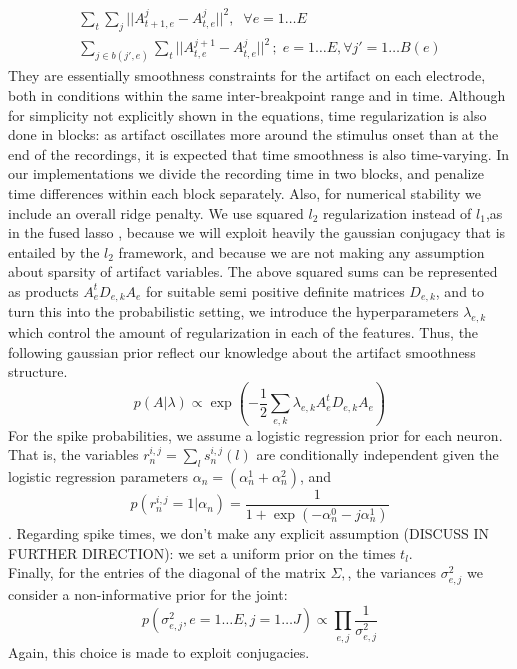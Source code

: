 \documentclass[12pt,letterpaper,fleqn]{article}
\begin{document}
\begin{eqnarray}
\nonumber \sum_t\sum_j ||A_{t+1,e}^j-A_{t,e}^j||^2,\;\;\forall e=1\ldots E \\
\nonumber \sum_{j\in b(j',e)}\sum_t ||A_{t,e}^{j+1}-A_{t,e}^j||^2\,;\; e=1\ldots E,\forall j' =1\ldots B(e)
\end{eqnarray}
They are essentially smoothness constraints for the artifact on each electrode, both in conditions within the same inter-breakpoint range and in time. Although for simplicity not explicitly shown in the equations, time regularization is also done in blocks: as artifact oscillates more around the stimulus onset than at the end of the recordings, it is expected that time smoothness is also time-varying. In our implementations we divide the recording time in two blocks, and penalize time differences within each block separately. Also, for numerical stability we include an overall ridge penalty.
We use squared $l_2$ regularization instead of $l_1$,as in the fused lasso \cite{TibshiraniEtal05}, because we will exploit heavily the gaussian conjugacy that is entailed by the $l_2$ framework, and because we are not making any assumption about sparsity of artifact variables. The above squared sums can be represented as products $A_e^tD_{e,k}A_e$ for suitable semi positive definite matrices $D_{e,k}$, and to turn this into the probabilistic setting, we introduce the hyperparameters $\lambda_{e,k} $ which control the amount of regularization in each of the features. Thus, the following gaussian prior reflect our knowledge about the artifact smoothness structure.
$$p(A|\lambda)\propto \exp\left(-\dfrac{1}{2} \sum_{e,k} \lambda_{e,k} A_e^tD_{e,k}A_e\right)$$
For the spike probabilities, we assume a logistic regression prior for each neuron. That is, the variables  $r_n^{i,j}=\sum_{l}s_n^{i,j}(l)$ are conditionally independent given the logistic regression parameters $\alpha_n=(\alpha_n^1+\alpha_n^2)$, and 
$$p(r_n^{i,j}=1|\alpha_n)=\dfrac{1}{1+\exp\left(-\alpha^0_n-j\alpha^1_n  \right)}$$. Regarding spike times, we don't make any explicit assumption (DISCUSS IN FURTHER DIRECTION): we set a uniform prior on the times $t_{l}$. \\
Finally, for the entries of the diagonal of the matrix $\Sigma,$, the variances $\sigma^2_{e,j}$ we consider a non-informative prior for the joint: $$p(\sigma^2_{e,j},e=1\ldots E,j=1\ldots J)\propto \prod_{e,j} \frac{1}{\sigma^2_{e,j}}$$
Again, this choice is made to exploit conjugacies.
\end{document}
